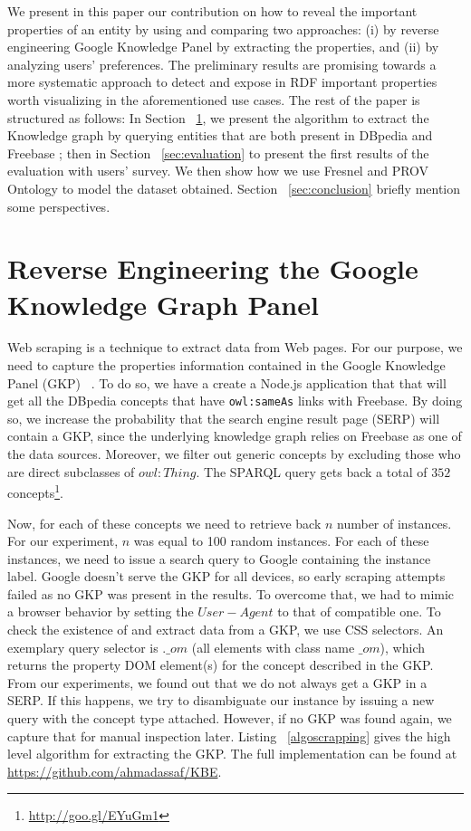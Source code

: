 \documentclass[runningheads,a4paper]{llncs}
\begin{document}
  We present in this paper our contribution on how to reveal the important properties of an entity by using and comparing two approaches: (i) by reverse engineering Google Knowledge Panel by extracting the properties, and (ii) by analyzing users' preferences. The preliminary results are promising towards a more systematic approach to detect and expose in RDF important properties worth visualizing in the aforementioned use cases. 
  The rest of the paper is structured as follows: In Section ~\ref{sec:knowledge-graph}, we present the algorithm to extract the Knowledge graph by querying entities that are both present in DBpedia and Freebase ; then in Section ~\ref{sec:evaluation} to present the first results of the evaluation with users' survey. We then show how we use Fresnel and PROV Ontology to model the dataset obtained. Section ~\ref{sec:conclusion} briefly mention some perspectives.


\section{Reverse Engineering the Google Knowledge Graph Panel}
\label{sec:knowledge-graph}

Web scraping is a technique to extract data from Web pages. For our purpose, we need to capture the properties information contained in the Google Knowledge Panel (GKP) ~\cite{Bergman2012}. To do so, we have a create a Node.js application that that will get all the DBpedia concepts that have \texttt{owl:sameAs} links with Freebase. By doing so, we increase the probability that the search engine result page (SERP) will contain a GKP, since the underlying knowledge graph relies on Freebase as one of the data sources. Moreover, we filter out generic concepts by excluding those who are direct subclasses of $owl:Thing$. The SPARQL query gets back a total of $352$ concepts\footnote{\url{http://goo.gl/EYuGm1}}.

Now, for each of these concepts we need to retrieve back $n$ number of instances. For our experiment, $n$ was equal to 100 random instances. For each of these instances, we need to issue a search query to Google containing the instance label. Google doesn't serve the GKP for all devices, so early scraping attempts failed as no GKP was present in the results. To overcome that, we had to mimic a browser behavior by setting the $User-Agent$ to that of compatible one.
To check the existence of and extract data from a GKP, we use CSS selectors. An exemplary query selector is $.\_om$ (all elements with class name $\_om$), which returns the property DOM element(s) for the concept described in the GKP. From our experiments, we found out that we do not always get a GKP in a SERP. If this happens, we try to disambiguate our instance by issuing a new query with the concept type attached. However, if no GKP was found again, we capture that for manual inspection later. Listing ~\ref{algoscrapping} gives the high level algorithm for extracting the GKP. The full implementation can be found at \url{https://github.com/ahmadassaf/KBE}.
\end{document}
